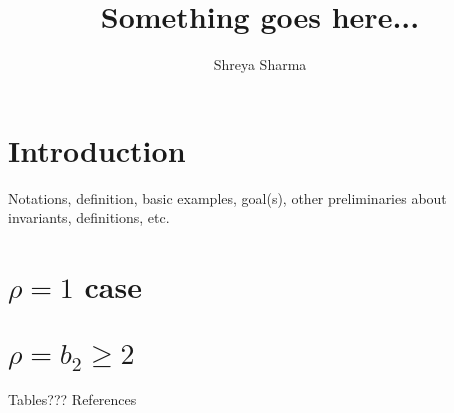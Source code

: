 \documentclass[12pt]{article}
\begin{document}
	\title{\large{Something goes here...}}
	\date{}
	\author{\small{Shreya Sharma}}
	\maketitle
	\tableofcontents
	
	\section{Introduction}
	Notations, definition, basic examples, goal(s), other preliminaries about invariants, definitions, etc.
	\section{$\rho =1$ case}
	\section{$\rho =b_2 \geq 2$}
	Tables???
	References
\end{document}
